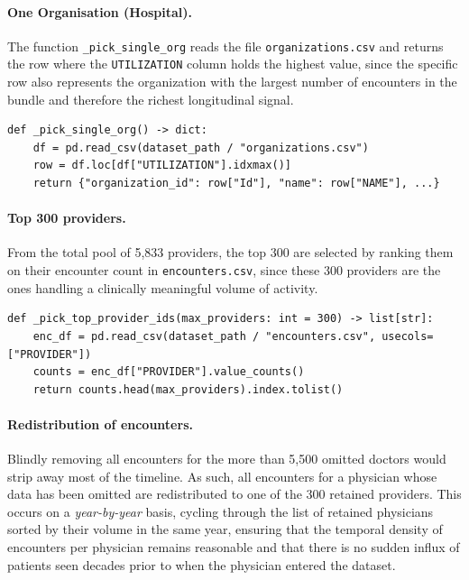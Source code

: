 \paragraph{One Organisation (Hospital).} The function \texttt{\_pick\_single\_org} reads the file \texttt{organizations.csv} and returns the row where the \texttt{UTILIZATION} column holds the highest value, since the specific row also represents the organization with the largest number of encounters in the bundle and therefore the richest longitudinal signal.

\begin{lstlisting}[style=pythonstyle]
def _pick_single_org() -> dict:
    df = pd.read_csv(dataset_path / "organizations.csv")
    row = df.loc[df["UTILIZATION"].idxmax()]
    return {"organization_id": row["Id"], "name": row["NAME"], ...}
\end{lstlisting}

\paragraph{Top 300 providers.} From the total pool of 5,833 providers, the top 300 are selected by ranking them on their encounter count in \texttt{encounters.csv}, since these 300 providers are the ones handling a clinically meaningful volume of activity.

\begin{lstlisting}[style=pythonstyle]
def _pick_top_provider_ids(max_providers: int = 300) -> list[str]:
    enc_df = pd.read_csv(dataset_path / "encounters.csv", usecols=["PROVIDER"])
    counts = enc_df["PROVIDER"].value_counts()
    return counts.head(max_providers).index.tolist()
\end{lstlisting}

\paragraph{Redistribution of encounters.} Blindly removing all encounters for the more than 5,500 omitted doctors would strip away most of the timeline. As such, all encounters for a physician whose data has been omitted are redistributed to one of the 300 retained providers. This occurs on a \emph{year-by-year} basis, cycling through the list of retained physicians sorted by their volume in the same year, ensuring that the temporal density of encounters per physician remains reasonable and that there is no sudden influx of patients seen decades prior to when the physician entered the dataset.

